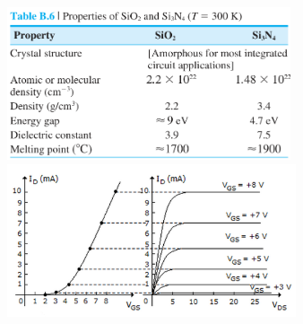 \documentclass{article}
\begin{document}
\begin{center}
    \includegraphics[align=c, height=4.5cm]{oxides.png}
    \includegraphics[align=c, height=4.5cm]{mosfetcurves.png}
\end{center}
\end{document}
